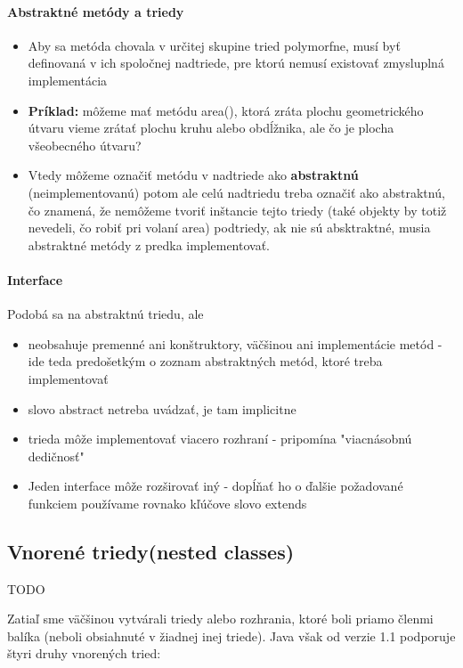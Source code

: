		\paragraph{Abstraktné metódy a triedy}
		\begin{itemize}
			\item Aby sa metóda chovala v určitej skupine tried polymorfne, musí byť definovaná v ich spoločnej nadtriede, pre ktorú nemusí existovať zmysluplná implementácia
			\item\textbf{Príklad:} môžeme mať metódu area(), ktorá zráta plochu geometrického útvaru vieme zrátať plochu kruhu alebo obdĺžnika, ale čo je plocha všeobecného útvaru? 
			\item Vtedy môžeme označiť metódu v nadtriede ako \textbf{abstraktnú} (neimplementovanú) potom ale celú nadtriedu treba označiť ako abstraktnú, čo znamená, že nemôžeme tvoriť inštancie tejto triedy (také objekty by totiž nevedeli, čo robiť pri volaní area) podtriedy, ak nie sú absktraktné, musia abstraktné metódy z predka implementovať.
		\end{itemize}
		\paragraph{Interface}
		Podobá sa na abstraktnú triedu, ale 
			\begin{itemize}
				\item neobsahuje premenné ani konštruktory, väčšinou ani implementácie metód - ide teda predošetkým o zoznam abstraktných metód, ktoré treba implementovať
				\item slovo abstract netreba uvádzať, je tam implicitne
				\item trieda môže implementovať viacero rozhraní - pripomína "viacnásobnú dedičnosť"
				\item Jeden interface môže rozširovať iný - dopĺňať ho o ďalšie požadované funkciem používame rovnako kľúčove slovo extends
			\end{itemize}

	\subsection{Vnorené triedy(nested classes)}
	TODO


Zatiaľ sme väčšinou vytvárali triedy alebo rozhrania, ktoré boli priamo členmi balíka (neboli obsiahnuté v žiadnej inej triede). Java však od verzie 1.1 podporuje štyri druhy vnorených tried:

